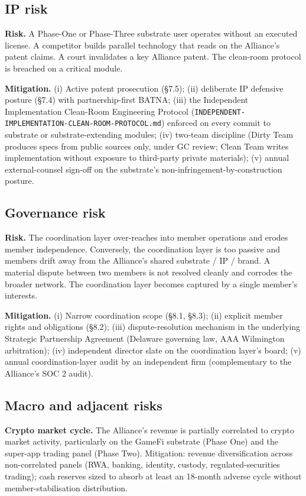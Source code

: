 \subsection{IP risk}

\textbf{Risk.} A Phase-One or Phase-Three substrate user operates
without an executed license. A competitor builds parallel technology that
reads on the Alliance's patent claims. A court invalidates a key Alliance
patent. The clean-room protocol is breached on a critical module.

\textbf{Mitigation.} (i) Active patent prosecution (\S 7.5); (ii)
deliberate IP defensive posture (\S 7.4) with partnership-first BATNA;
(iii) the Independent Implementation Clean-Room Engineering Protocol
(\texttt{INDEPENDENT-IMPLEMENTATION-CLEAN-ROOM-PROTOCOL.md}) enforced on
every commit to substrate or substrate-extending modules; (iv) two-team
discipline (Dirty Team produces specs from public sources only, under
GC review; Clean Team writes implementation without exposure to
third-party private materials); (v) annual external-counsel sign-off
on the substrate's non-infringement-by-construction posture.

\subsection{Governance risk}

\textbf{Risk.} The coordination layer over-reaches into member
operations and erodes member independence. Conversely, the coordination
layer is too passive and members drift away from the Alliance's shared
substrate / IP / brand. A material dispute between two members is not
resolved cleanly and corrodes the broader network. The coordination
layer becomes captured by a single member's interests.

\textbf{Mitigation.} (i) Narrow coordination scope (\S 8.1, \S 8.3);
(ii) explicit member rights and obligations (\S 8.2); (iii)
dispute-resolution mechanism in the underlying Strategic Partnership
Agreement (Delaware governing law, AAA Wilmington arbitration);
(iv) independent director slate on the coordination layer's board;
(v) annual coordination-layer audit by an independent firm
(complementary to the Alliance's SOC 2 audit).

\subsection{Macro and adjacent risks}

\textbf{Crypto market cycle.} The Alliance's revenue is partially
correlated to crypto market activity, particularly on the GameFi
substrate (Phase One) and the super-app trading panel (Phase Two).
Mitigation: revenue diversification across non-correlated panels
(RWA, banking, identity, custody, regulated-securities trading); cash
reserves sized to absorb at least an 18-month adverse cycle without
member-stabilisation distribution.

